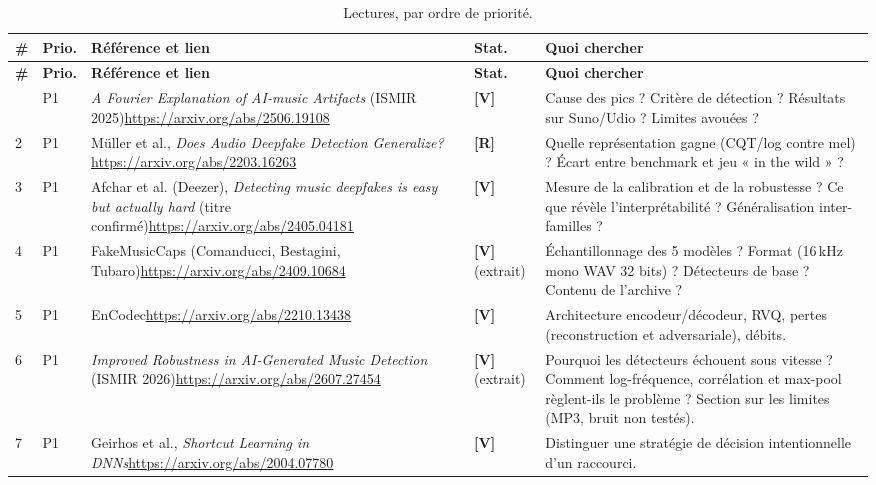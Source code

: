 \documentclass[11pt,a4paper]{article}
\newcommand{\sV}{\textbf{[V]}}
\newcommand{\sR}{\textbf{[R]}}
\begin{document}
{\small
\begin{longtable}{L{0.6cm}L{0.8cm}L{6.1cm}L{1.0cm}L{5.0cm}}
\caption{Lectures, par ordre de priorité.}\label{tab:biblio}\\
\toprule
\textbf{\#} & \textbf{Prio.} & \textbf{Référence et lien} & \textbf{Stat.} & \textbf{Quoi chercher}\\
\midrule
\endfirsthead
\toprule
\textbf{\#} & \textbf{Prio.} & \textbf{Référence et lien} & \textbf{Stat.} & \textbf{Quoi chercher}\\
\midrule
\endhead
\bottomrule
{} & P1 & \emph{A Fourier Explanation of AI-music Artifacts} (ISMIR 2025)\newline \url{https://arxiv.org/abs/2506.19108} & \sV & Cause des pics ? Critère de détection ? Résultats sur Suno/Udio ? Limites avouées ?\\
2 & P1 & Müller et al., \emph{Does Audio Deepfake Detection Generalize?}\newline \url{https://arxiv.org/abs/2203.16263} & \sR & Quelle représentation gagne (CQT/log contre mel) ? Écart entre benchmark et jeu « in the wild » ?\\
3 & P1 & Afchar et al. (Deezer), \emph{Detecting music deepfakes is easy but actually hard} (titre confirmé)\newline \url{https://arxiv.org/abs/2405.04181} & \sV & Mesure de la calibration et de la robustesse ? Ce que révèle l'interprétabilité ? Généralisation inter-familles ?\\
4 & P1 & FakeMusicCaps (Comanducci, Bestagini, Tubaro)\newline \url{https://arxiv.org/abs/2409.10684} & \sV{} (extrait) & Échantillonnage des 5 modèles ? Format (16\,kHz mono WAV 32 bits) ? Détecteurs de base ? Contenu de l'archive ?\\
5 & P1 & EnCodec\newline \url{https://arxiv.org/abs/2210.13438} & \sV & Architecture encodeur/décodeur, RVQ, pertes (reconstruction et adversariale), débits.\\
6 & P1 & \emph{Improved Robustness in AI-Generated Music Detection} (ISMIR 2026)\newline \url{https://arxiv.org/abs/2607.27454} & \sV{} (extrait) & Pourquoi les détecteurs échouent sous vitesse ? Comment log-fréquence, corrélation et max-pool règlent-ils le problème ? Section sur les limites (MP3, bruit non testés).\\
7 & P1 & Geirhos et al., \emph{Shortcut Learning in DNNs}\newline \url{https://arxiv.org/abs/2004.07780} & \sV & Distinguer une stratégie de décision intentionnelle d'un raccourci.\\

\end{longtable}}
\end{document}
